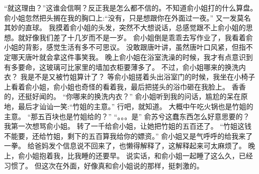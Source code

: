 “就这理由？”这谁会信啊？反正我是怎么都不信的。不知道俞小姐打的什么算盘。
俞小姐忽然把头搁在我的胸口上:“没有，只是想跟你在外面过一夜。”
又一发莫名其妙的直球。
我摸着俞小姐的头发，突然不大想说话，总感觉跟不上俞小姐的思想。就好像我们差了十几岁而不是一岁。
俞小姐倒是乖乖去写作业了，我看着俞小姐的背影，感觉生活有多不可思议。
没敢跟唐叶讲，虽然唐叶口风紧，但指不定哪天唐叶就会拿这件事笑我。
晚上俞小姐在浴室洗澡的时候，我才有点意识到有多要命，这玻璃可比家里的墙加衣柜要薄多了。
不过，俞小姐哪来的换洗内衣？
我是不是又被竹姐算计了？
等俞小姐搓着头出浴室门的时候，我坐在小椅子上看着俞小姐，俞小姐也奇怪的看着我，最后把搓头的浴巾砸在我脸上。
香香的，还挺好闻的。
“你哪来的换洗内衣？”
俞小姐听到我的问话，尴尬的呆在原地，最后才讪讪一笑:“竹姐的主意。”
行吧，就知道。
大概中午吃火锅也是竹姐的主意。
“那五百块也是竹姐给的？”
“。。。是”
俞苏兮这蠢东西怎么好意思要的？
我第一次想骂俞小姐。
转了一千给俞小姐，让她把竹姐的五百还了。
“竹姐这钱不能要，还给竹姐，剩下的五百算我给你的嫖资。”
俞小姐又是气呼呼的给我来了一拳。
给爸妈发个信息说不回来了，也懒得解释了，这解释起来可太麻烦了。
晚上，俞小姐抱着我，比我睡的还要早。
说实话，和俞小姐一起睡了这么久，已经习惯了。
但这次在外面，好像真和俞小姐说的那样，挺刺激的。

